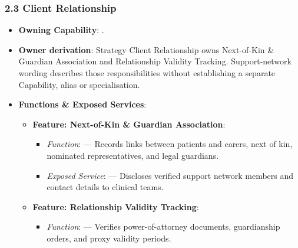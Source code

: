 \par\smallskip
{}\label{rad:em:54}
\subsubsection*{2.3 Client Relationship}
\label{rad:em:55}

\begin{itemize}

\item 
\textbf{Owning Capability}: \texttt{}.



\item 
\textbf{Owner derivation}: Strategy Client Relationship owns Next-of-Kin \& Guardian Association and Relationship Validity Tracking. Support-network wording describes those responsibilities without establishing a separate Capability, alias or specialisation.



\item 
\textbf{Functions \& Exposed Services}:


\begin{itemize}

\item 
\textbf{Feature: Next-of-Kin \& Guardian Association}:


\begin{itemize}

\item 
\emph{Function}: \texttt{} — Records links between patients and carers, next of kin, nominated representatives, and legal guardians.



\item 
\emph{Exposed Service}: \texttt{} — Discloses verified support network members and contact details to clinical teams.



\end{itemize}


\item 
\textbf{Feature: Relationship Validity Tracking}:


\begin{itemize}

\item 
\emph{Function}: \texttt{} — Verifies power-of-attorney documents, guardianship orders, and proxy validity periods.




\end{itemize}
\end{itemize}
\end{itemize}
